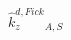 \documentclass[border=2pt]{standalone}
\begin{document}
${{\hat{k}^{d,Fick}_z}}{_{A, S}}$
\end{document}
